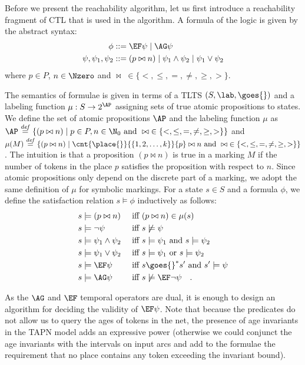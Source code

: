 Before we present the reachability algorithm, let us first introduce a reachability fragment of CTL that is used in the algorithm. A formula of the logic is given by the abstract syntax: 
\begin{align}
\phi &::= \EF \psi \mid \AG \psi \nonumber\\
\psi,\psi_1,\psi_2 &::= (p \bowtie n) \mid 
\psi_1 \wedge \psi_2 \mid \psi_1 \vee \psi_2 \label{eqn:psi}
\end{align}
where $p \in P$, $n \in \Nzero$ and
$\bowtie \; \in \{<,\leq, =, \not=, \geq, >\}$.

The semantics of formulae is given in terms of a TLTS $(S, \lab, \goes{})$ and a labeling function $\mu : S \rightarrow 2^\AP$ assigning sets of true atomic propositions to states. We define the set of atomic propositions $\AP$ and the labeling function $\mu$ as $\AP \stackrel{\mathit{def}}{=} \{ (p \bowtie n) \mid p \in P, n \in \N_0 \text{ and } 
\bowtie \; \in \{ <, \leq, =, \not=, \geq, > \}\}$ and $\mu(M) \stackrel{\mathit{def}}{=} \{ (p \bowtie n) \mid \cnt{\place{}}{\{1,2,\ldots,k\}}{p} \bowtie n \text{ and } \bowtie\; \in \{<, \leq, =, \not=, \geq, > \}\}$. The intuition is that a proposition $(p \bowtie n)$ is true in a marking $M$ if the number of tokens in the place $p$ satisfies the proposition with respect to $n$. Since atomic propositions only depend on the discrete part of a marking, we adopt the same definition of $\mu$ for symbolic markings. For a state $s \in S$ and a formula $\phi$, we define the satisfaction relation $s \models \phi$ inductively as follows:
\begin{alignat*}{2}
s &\models (p \bowtie n)		&&\text{ iff } (p \bowtie n) \in \mu(s) \\
s &\models \neg \psi			&&\text{ iff } s \not\models \psi \\
s &\models \psi_1 \wedge \psi_2		&&\text{ iff } s \models \psi_1 \text{ and } s \models \psi_2 \\
s &\models \psi_1 \vee \psi_2 		&&\text{ iff } s \models \psi_1 \text{ or } s \models \psi_2 \\
s &\models \EF \psi			&&\text{ iff } s \goes{}^* s' \text{ and } s' \models \psi \\
s &\models \AG \psi			&&\text{ iff } s \not\models \EF \neg \psi \quad .\\
\end{alignat*}



As the $\AG$ and $\EF$ temporal operators are dual, it is enough to
design an algorithm for deciding the validity of $\EF \psi$.
Note that because the predicates do not allow us to query the ages
of tokens in the net, the presence of age invariants in the TAPN model
adds an expressive power (otherwise we could conjunct the age invariants
with the intervals on input arcs and add to the formulae the requirement that
no place contains any token exceeding the invariant bound).

